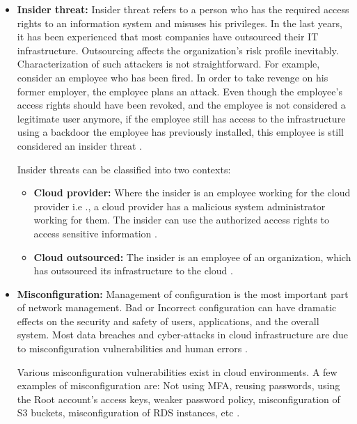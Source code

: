 \begin{itemize}
    \item \textbf{Insider threat:} Insider threat refers to a person who has the required access rights to an
    information system and misuses his privileges.
    In the last years, it has been experienced that most companies have outsourced their IT infrastructure.
    Outsourcing affects the organization’s risk profile inevitably.
    Characterization of such attackers is not straightforward.
    For example, consider an employee who has been fired.
    In order to take revenge on his former employer, the
    employee plans an attack.
    Even though the employee's access rights should have been revoked, and the employee is not considered a
    legitimate user anymore, if the employee still has access to the infrastructure using a backdoor the employee has previously installed, this employee is still considered an insider threat \cite{46}.

    Insider threats can be classified into two contexts:
    \begin{itemize}
        \item \textbf{Cloud provider:} Where the insider
        is an employee working for the cloud provider i.e
        ., a cloud provider has a malicious system
        administrator working for them.
        The insider can use the authorized access
        rights to access sensitive information \cite{46}.
    \end{itemize}
    \begin{itemize}
        \item \textbf{Cloud outsourced:} The insider is an employee of an organization, which has outsourced its
        infrastructure to the cloud \cite{46}.
    \end{itemize}
\end{itemize}

\begin{itemize}
    \item \textbf{Misconfiguration:} Management of configuration is the most important part of network management.
    Bad or Incorrect configuration can have dramatic effects on the security and safety of users, applications, and the overall system. Most data breaches and cyber-attacks in cloud infrastructure are due to misconfiguration vulnerabilities and human errors \cite{44}.

    Various misconfiguration vulnerabilities exist in cloud environments.
    A few examples of misconfiguration are: Not
    using MFA, reusing passwords, using the Root account’s access keys, weaker password policy, misconfiguration of S3
    buckets,  misconfiguration of RDS
    instances, etc \cite{45}.
\end{itemize}

